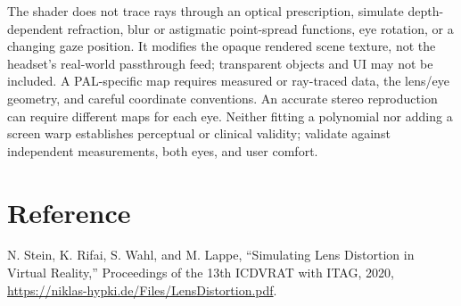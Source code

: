 \documentclass[11pt,a4paper]{article}
\begin{document}
The shader does not trace rays through an optical prescription, simulate
depth-dependent refraction, blur or astigmatic point-spread functions, eye
rotation, or a changing gaze position. It modifies the opaque rendered scene
texture, not the headset's real-world passthrough feed; transparent objects
and UI may not be included. A PAL-specific map requires measured or
ray-traced data, the lens/eye geometry, and careful coordinate conventions.
An accurate stereo reproduction can require different maps for each eye.
Neither fitting a polynomial nor adding a screen warp establishes perceptual
or clinical validity; validate against independent measurements, both eyes,
and user comfort.

\section{Reference}
N. Stein, K. Rifai, S. Wahl, and M. Lappe, ``Simulating Lens Distortion in
Virtual Reality,'' Proceedings of the 13th ICDVRAT with ITAG, 2020,
\url{https://niklas-hypki.de/Files/LensDistortion.pdf}.
\end{document}
